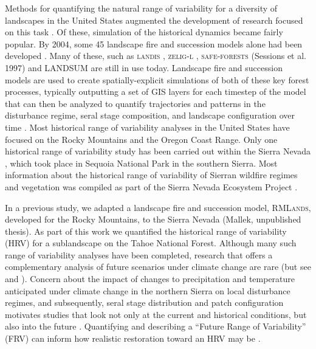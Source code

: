 \documentclass[12pt]{article}
\begin{document}
\begin{spacing}{1}

Methods for quantifying the natural range of variability for a diversity of landscapes in the United States augmented the development of research focused on this task \citep{Landres1999}. Of these, simulation of the historical dynamics became fairly popular. By 2004, some 45 landscape fire and succession models alone had been developed \citep{Keane2004}. Many of these, such as \textsc{landis} \citep{He1999}, \textsc{zelig-l} \citep{Miller1999}, \textsc{safe-forests} (Sessions et al. 1997) and LANDSUM \citep{Keane2012} are still in use today. Landscape fire and succession models are used to create spatially-explicit simulations of both of these key forest processes, typically outputting a set of GIS layers for each timestep of the model that can then be analyzed to quantify trajectories and patterns in the disturbance regime, seral stage composition, and landscape configuration over time \citep{Keane2004}. Most historical range of variability analyses in the United States have focused on the Rocky Mountains and the Oregon Coast Range. Only one historical range of variability study has been carried out within the Sierra Nevada \citep{Miller1999}, which took place in Sequoia National Park in the southern Sierra. Most information about the historical range of variability of Sierran wildfire regimes and vegetation was compiled as part of the Sierra Nevada Ecosystem Project \citep{SNEP1996a}. 

In a previous study, we adapted a landscape fire and succession model, \textsc{RMLands}, developed for the Rocky Mountains, to the Sierra Nevada (Mallek, unpublished thesis). As part of this work we quantified the historical range of variability (HRV) for a sublandscape on the Tahoe National Forest. Although many such range of variability analyses have been completed, research that offers a complementary analysis of future scenarios under climate change are rare (but see \cite{Keane2008} and \cite{Duveneck2014}). Concern about the impact of changes to precipitation and temperature anticipated under climate change in the northern Sierra on local disturbance regimes, and subsequently, seral stage distribution and patch configuration motivates studies that look not only at the current and historical conditions, but also into the future \citep{Fule2008,North2012}. Quantifying and describing a ``Future Range of Variability'' (FRV) can inform how realistic restoration toward an HRV may be \citep{Duncan2010}.


\end{spacing}
\end{document}
